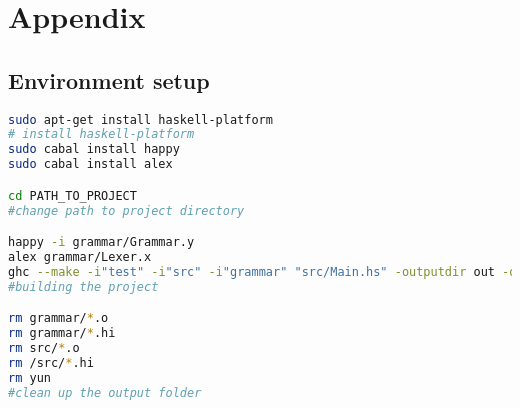 \chapter{Appendix}
\section{Environment setup}
\begin{lstlisting}[language=bash]
sudo apt-get install haskell-platform
# install haskell-platform
sudo cabal install happy
sudo cabal install alex

cd PATH_TO_PROJECT
#change path to project directory

happy -i grammar/Grammar.y
alex grammar/Lexer.x
ghc --make -i"test" -i"src" -i"grammar" "src/Main.hs" -outputdir out -o yun
#building the project

rm grammar/*.o
rm grammar/*.hi
rm src/*.o
rm /src/*.hi
rm yun
#clean up the output folder
\end{lstlisting}


%
